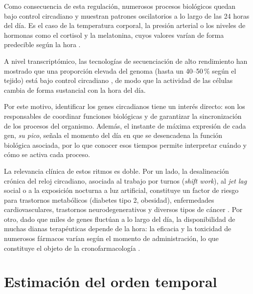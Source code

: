 \documentclass[12pt, a4paper]{report}
\begin{document}
Como consecuencia de esta regulación, numerosos procesos biológicos quedan bajo control circadiano y muestran patrones oscilatorios a lo largo de las 24 horas del día. Es el caso de la temperatura corporal, la presión arterial o los niveles de hormonas como el cortisol y la melatonina, cuyos valores varían de forma predecible según la hora \cite{czeisler1999, roenneberg2016}.

A nivel transcriptómico, las tecnologías de secuenciación de alto rendimiento han mostrado que una proporción elevada del genoma (hasta un 40--50\,\% según el tejido) está bajo control circadiano \cite{zhang2014, hughes2009}, de modo que la actividad de las células cambia de forma sustancial con la hora del día.

Por este motivo, identificar los genes circadianos tiene un interés directo: son los responsables de coordinar funciones biológicas y de garantizar la sincronización de los procesos del organismo. Además, el instante de máxima expresión de cada gen, \textit{su pico}, señala el momento del día en que se desencadena la función biológica asociada, por lo que conocer esos tiempos permite interpretar cuándo y cómo se activa cada proceso.

La relevancia clínica de estos ritmos es doble. Por un lado, la desalineación crónica del reloj circadiano, asociada al trabajo por turnos (\textit{shift work}), al \textit{jet lag} social o a la exposición nocturna a luz artificial, constituye un factor de riesgo para trastornos metabólicos (diabetes tipo 2, obesidad), enfermedades cardiovasculares, trastornos neurodegenerativos y diversos tipos de cáncer \cite{sulli2018,sahar2009}.
Por otro, dado que miles de genes fluctúan a lo largo del día, la disponibilidad de muchas dianas terapéuticas depende de la hora: la eficacia y la toxicidad de numerosos fármacos varían según el momento de administración, lo que constituye el objeto de la cronofarmacología \cite{antoch2013, hesse2021}.

\section{Estimación del orden temporal}
\end{document}
